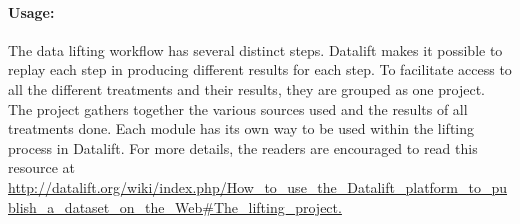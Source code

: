 \paragraph{Usage:}
The data lifting workflow has several distinct steps. Datalift makes it possible to replay each step in producing different results for each step. To facilitate access to all the different treatments and their results, they are grouped as one project. The project gathers together the various sources used and the results of all treatments done. Each module has its own way to be used within the lifting process in Datalift. For more details, the readers are encouraged to read this resource at \\\url{http://datalift.org/wiki/index.php/How_to_use_the_Datalift_platform_to_publish_a_dataset_on_the_Web#The_lifting_project.
}

